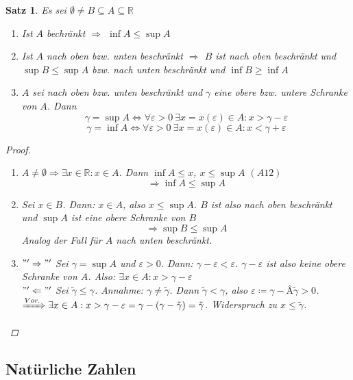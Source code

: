 \documentclass[titlepage,ngerman,a4paper,headsepline,DIV15,halfparskip*,14pt]{scrartcl}
\newcommand{\R}{\mathbb{R}}
\theoremstyle{dotless}
\newtheorem{satz}{Satz}[section]
\begin{document}
\begin{satz} \label{satz:1.2}
	Es sei $\emptyset \neq B \subseteq A \subseteq \R$
	\begin{enumerate}
		\item Ist $A$ bechränkt $\Rightarrow$ $\inf A \leq \sup A$
		\item Ist $A$ nach oben bzw. unten beschränkt $\Rightarrow$ $B$ ist nach oben beschränkt und $\sup B \leq \sup A$ bzw. nach unten beschränkt und $\inf B \geq \inf A$
		\item $A$ sei nach oben bzw. unten beschränkt und $\gamma$ eine obere bzw. untere Schranke von $A$. Dann
			$$
				\gamma = \sup A \iff \forall \varepsilon > 0 ~\exists x = x(\varepsilon) \in A : x > \gamma - \varepsilon
			$$
			$$
				\gamma = \inf A \iff \forall \varepsilon > 0 ~\exists x = x(\varepsilon) \in A : x < \gamma + \varepsilon
			$$			
	\end{enumerate}

	\begin{proof} \ 
	  \begin{enumerate}
		\item $A \neq \emptyset \Rightarrow \exists x \in \R : x \in A$. Dann $\inf A \leq x$, $x \leq \sup A$ $(A12)$
			$$ \Rightarrow \inf A \leq \sup A $$
		\item Sei $x \in B$. Dann: $x \in A$, also $x \leq \sup A$. $B$ ist also nach oben beschränkt und $\sup A$ ist eine obere Schranke von $B$
			$$ \Rightarrow \sup B \leq \sup A $$
			Analog der Fall für $A$ nach unten beschränkt.
		\item $"'\Rightarrow"'$ Sei $\gamma = \sup A$ und $\varepsilon > 0$. Dann: $\gamma - \varepsilon < \varepsilon$. $\gamma - \varepsilon$ ist also keine obere Schranke von $A$. Also: $\exists x \in A : x > \gamma - \varepsilon$ \\
			$"'\Leftarrow"'$ Sei $\tilde{\gamma} \leq \gamma$. Annahme: $\gamma \neq \tilde{\gamma}$. Dann $\tilde{\gamma} < \gamma$, also $\varepsilon \coloneqq \gamma -Â \tilde{\gamma} > 0$.\\
			$\xRightarrow[]{Vor.} \exists x \in A: x > \gamma - \varepsilon = \gamma- (\gamma - \tilde{\gamma}) = \tilde{\gamma}$. Widerspruch zu $x \leq \tilde{\gamma}$.
			\end{enumerate}
	\end{proof}
\end{satz}


\subsection*{Natürliche Zahlen} 
\end{document}
